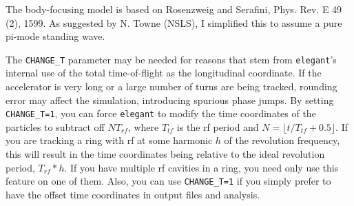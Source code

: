 The body-focusing model is based on Rosenzweig and Serafini, Phys. Rev. E 49 (2),
1599.  As suggested by N. Towne (NSLS), I simplified this to assume a pure pi-mode
standing wave.

The \verb|CHANGE_T| parameter may be needed for reasons that stem from
{\tt elegant}'s internal use of the total time-of-flight as the
longitudinal coordinate.  If the accelerator is very long or a large
number of turns are being tracked, rounding error may affect the
simulation, introducing spurious phase jumps.  By setting
\verb|CHANGE_T=1|, you can force {\tt elegant} to modify the time
coordinates of the particles to subtract off $N T_{rf}$, where
$T_{tf}$ is the rf period and $N = \lfloor t/T_{tf}+0.5\rfloor$.  If
you are tracking a ring with rf at some harmonic $h$ of the revolution
frequency, this will result in the time coordinates being relative to
the ideal revolution period, $T_{rf}*h$.  If you have multiple rf
cavities in a ring, you need only use this feature on one of them.
Also, you can use \verb|CHANGE_T=1| if you simply prefer to have the
offset time coordinates in output files and analysis.
